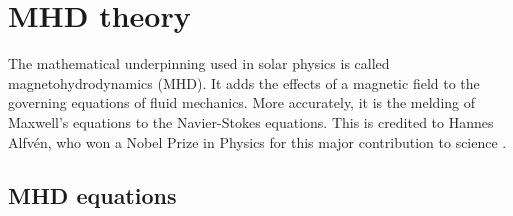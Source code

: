 \section{MHD theory}

    The mathematical underpinning used in solar physics is called magnetohydrodynamics (MHD).
    It adds the effects of a magnetic field to the governing equations of fluid mechanics. 
    More accurately, it is the melding of Maxwell's equations to the Navier-Stokes equations.
    This is credited to Hannes Alfv\'en, who won a Nobel Prize in Physics for this major contribution to science \citep{1942Natur.150..405A,erdelyi2007}.

\subsection{MHD equations}

